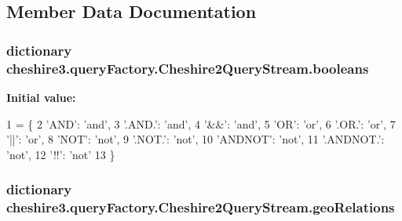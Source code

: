 \subsection{Member Data Documentation}
\hypertarget{classcheshire3_1_1query_factory_1_1_cheshire2_query_stream_a5b151a8e768a15bfa1f8c33a66fe2cae}{
\subsubsection[{booleans}]{\setlength{\rightskip}{0pt plus 5cm}dictionary cheshire3.\-query\-Factory.\-Cheshire2\-Query\-Stream.\-booleans\hspace{0.3cm}{\ttfamily [static]}}}\label{classcheshire3_1_1query_factory_1_1_cheshire2_query_stream_a5b151a8e768a15bfa1f8c33a66fe2cae}
{\bfseries Initial value\-:}
\begin{DoxyCode}
1 = \{
2                 \textcolor{stringliteral}{'AND'}: \textcolor{stringliteral}{'and'},
3                 \textcolor{stringliteral}{'.AND.'}: \textcolor{stringliteral}{'and'},
4                 \textcolor{stringliteral}{'&&'}: \textcolor{stringliteral}{'and'},
5                 \textcolor{stringliteral}{'OR'}: \textcolor{stringliteral}{'or'},
6                 \textcolor{stringliteral}{'.OR.'}: \textcolor{stringliteral}{'or'},
7                 \textcolor{stringliteral}{'||'}: \textcolor{stringliteral}{'or'},
8                 \textcolor{stringliteral}{'NOT'}: \textcolor{stringliteral}{'not'},
9                 \textcolor{stringliteral}{'.NOT.'}: \textcolor{stringliteral}{'not'},
10                 \textcolor{stringliteral}{'ANDNOT'}: \textcolor{stringliteral}{'not'},
11                 \textcolor{stringliteral}{'.ANDNOT.'}: \textcolor{stringliteral}{'not'},
12                 \textcolor{stringliteral}{'!!'}: \textcolor{stringliteral}{'not'}
13                 \}
\end{DoxyCode}
\hypertarget{classcheshire3_1_1query_factory_1_1_cheshire2_query_stream_a2140fed791e12fa4ddaca42c8d54af73}{
\subsubsection[{geo\-Relations}]{\setlength{\rightskip}{0pt plus 5cm}dictionary cheshire3.\-query\-Factory.\-Cheshire2\-Query\-Stream.\-geo\-Relations\hspace{0.3cm}{\ttfamily [static]}}}\label{classcheshire3_1_1query_factory_1_1_cheshire2_query_stream_a2140fed791e12fa4ddaca42c8d54af73}
